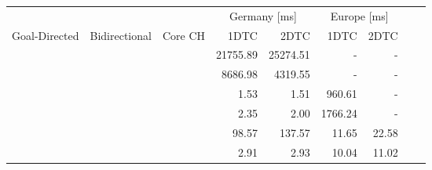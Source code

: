 \begin{tabular}{cccrrrrrr}
	\toprule
	              &               &         & \multicolumn{2}{c}{Germany [\si{\milli\second}]} & \multicolumn{2}{c}{Europe [\si{\milli\second}]}               \\
	Goal-Directed & Bidirectional & Core CH & 1DTC                                             & 2DTC                                            & 1DTC & 2DTC \\
	\midrule
	\xmark        & \xmark        & \xmark  & 21755.89                                                & 25274.51                                               & -    & -    \\
	\xmark        & \cmark        & \xmark  & 8686.98                                                & 4319.55                                               & -    & -    \\
	\cmark        & \xmark        & \xmark  & 1.53                                                & 1.51                                               & 960.61    & -    \\
	\cmark        & \cmark        & \xmark  & 2.35                                                & 2.00                                               & 1766.24    & -    \\
	\xmark        & \cmark        & \cmark  & 98.57                                                & 137.57                                               & 11.65    & 22.58    \\
	\cmark        & \cmark        & \cmark  & 2.91                                                & 2.93                                               & 10.04    & 11.02    \\
	\bottomrule
\end{tabular}